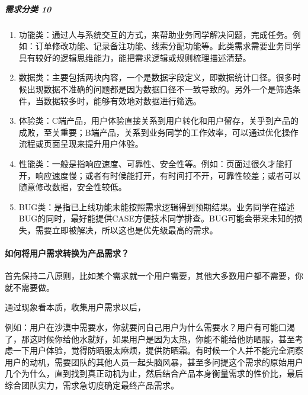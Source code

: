 \documentclass[letterpaper,10pt,english]{sphinxmanual}
\begin{document}
\subparagraph{需求分类 10\sphinxfootnotemark[539]}
\label{\detokenize{chapter_knowledge/demand_analysis:id3}}%
\begin{footnotetext}[539]\sphinxAtStartFootnote
{}
%
\end{footnotetext}\ignorespaces \begin{enumerate}
%
\item {} 
功能类：通过人与系统交互的方式，来帮助业务同学解决问题，完成任务。例如：订单修改功能、记录备注功能、线索分配功能等。此类需求需要业务同学具有较好的逻辑思维能力，能把需求逻辑或规则梳理描述清楚。

\item {} 
数据类：主要包括两块内容，一个是数据字段定义，即数据统计口径。很多时候出现数据不准确的问题都是因为数据口径不一致导致的。另外一个是筛选条件，当数据较多时，能够有效地对数据进行筛选。

\item {} 
体验类：C端产品，用户体验直接关系到用户转化和用户留存，关乎到产品的成败，至关重要；B端产品，关系到业务同学的工作效率，可以通过优化操作流程或页面呈现来提升用户体验。

\item {} 
性能类：一般是指响应速度、可靠性、安全性等。例如：页面过很久才能打开，响应速度慢；或者有时候能打开，有时间打不开，可靠性较差；或者可以随意修改数据，安全性较低。

\item {} 
BUG类：是指已上线功能未能按照需求逻辑得到预期结果。业务同学在描述BUG的同时，最好能提供CASE方便技术同学排查。BUG可能会带来未知的损失，需要立即被解决，所以这也是优先级最高的需求。

\end{enumerate}


\paragraph{如何将用户需求转换为产品需求？}
\label{\detokenize{chapter_knowledge/demand_analysis:id4}}
首先保持二八原则，比如某个需求就一个用户需要，其他大多数用户都不需要，你就不需要做。

通过现象看本质，收集用户需求以后，

例如：用户在沙漠中需要水，你就要问自己用户为什么需要水？用户有可能口渴了，那这时候你给他水就好，如果用户是因为太热，你能不能给他防晒服，甚至考虑一下用户体验，觉得防晒服太麻烦，提供防晒霜。有时候一个人并不能完全洞察用户的动机，需要团队的其他人员一起头脑风暴，甚至多问提这个需求的原始用户几个为什么，直到找到真正动机为止，然后结合产品本身衡量需求的性价比，最后综合团队实力，需求急切度确定最终产品需求。
\end{document}
